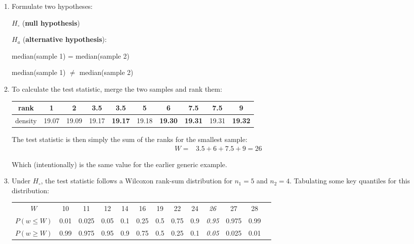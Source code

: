 \begin{enumerate}
\item  Formulate two hypotheses:

  \noindent\begin{minipage}{.4\textwidth}
    $H_\circ$ (\textbf{null hypothesis})
    
    \vspace{1em}
    
    $H_a$ (\textbf{alternative hypothesis}):
  \end{minipage}
  \begin{minipage}{.2\textwidth}
  \end{minipage}
  \begin{minipage}{.4\textwidth}
    median(sample 1) = median(sample 2)
    
    \vspace{1em}
    
    median(sample 1) $\neq$ median(sample 2)
  \end{minipage}
  
\item To calculate the test statistic, merge the two samples and rank
  them:

  \begin{center}
    \begin{tabular}{c|ccccccccc}
      rank & 1 & 2 & 3.5 & \textbf{3.5} & 5 & \textbf{6} & 7.5 &
      \textbf{7.5} & \textbf{9} \\ \hline
      density & 19.07 & 19.09 & 19.17 & \textbf{19.17} & 19.18 &
      \textbf{19.30} & \textbf{19.31} & 19.31 & \textbf{19.32}
    \end{tabular}
  \end{center}

  The test statistic is then simply the sum of the ranks for the
  smallest sample:
  \begin{equation*}
    \begin{split}
      W = & 3.5 + 6 + 7.5 + 9 = 26
    \end{split}
  \end{equation*}

  Which (intentionally) is the same value for the earlier generic
  example.

\item Under $H_\circ$, the test statistic follows a Wilcoxon rank-sum
  distribution for $n_1=5$ and $n_2=4$. Tabulating some key quantiles
  for this distribution:

  \begin{center}
    \begin{tabular}{c|c@{\gap}c@{\gap}c@{\gap}c@{\gap}
        c@{\gap}c@{\gap}c@{\gap}c@{\gap}c@{\gap}c@{\gap}c@{\gap}c}
      $W$ & 10 & 11 & 12 & 14 & 16 & 19 & 22 & 24 & \emph{26} & 27 & 28 \\
      $P(w\leq{W})$ & 0.01 & 0.025 & 0.05 & 0.1 & 0.25 &
      0.5 & 0.75 & 0.9 & \emph{0.95} & 0.975 & 0.99 \\
      $P(w\geq{W})$ & 0.99 & 0.975 & 0.95 & 0.9 & 0.75 & 0.5 &
      0.25 & 0.1 & \emph{0.05} & 0.025 & 0.01
    \end{tabular}
  \end{center}


\end{enumerate}
